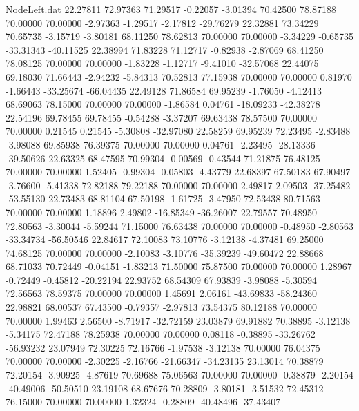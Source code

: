 \begin{filecontents}{NodeLeft.dat}
  22.27811   72.97363   71.29517    -0.22057   -3.01394   70.42500   78.87188   70.00000   70.00000   -2.97363   -1.29517   -2.17812  -29.76279
  22.32881   73.34229   70.65735    -3.15719   -3.80181   68.11250   78.62813   70.00000   70.00000   -3.34229   -0.65735  -33.31343  -40.11525
  22.38994   71.83228   71.12717    -0.82938   -2.87069   68.41250   78.08125   70.00000   70.00000   -1.83228   -1.12717   -9.41010  -32.57068
  22.44075   69.18030   71.66443    -2.94232   -5.84313   70.52813   77.15938   70.00000   70.00000    0.81970   -1.66443  -33.25674  -66.04435
  22.49128   71.86584   69.95239    -1.76050   -4.12413   68.69063   78.15000   70.00000   70.00000   -1.86584    0.04761  -18.09233  -42.38278
  22.54196   69.78455   69.78455    -0.54288   -3.37207   69.63438   78.57500   70.00000   70.00000    0.21545    0.21545   -5.30808  -32.97080
  22.58259   69.95239   72.23495    -2.83488   -3.98088   69.85938   76.39375   70.00000   70.00000    0.04761   -2.23495  -28.13336  -39.50626
  22.63325   68.47595   70.99304    -0.00569   -0.43544   71.21875   76.48125   70.00000   70.00000    1.52405   -0.99304   -0.05803   -4.43779
  22.68397   67.50183   67.90497    -3.76600   -5.41338   72.82188   79.22188   70.00000   70.00000    2.49817    2.09503  -37.25482  -53.55130
  22.73483   68.81104   67.50198    -1.61725   -3.47950   72.53438   80.71563   70.00000   70.00000    1.18896    2.49802  -16.85349  -36.26007
  22.79557   70.48950   72.80563    -3.30044   -5.59244   71.15000   76.63438   70.00000   70.00000   -0.48950   -2.80563  -33.34734  -56.50546
  22.84617   72.10083   73.10776    -3.12138   -4.37481   69.25000   74.68125   70.00000   70.00000   -2.10083   -3.10776  -35.39239  -49.60472
  22.88668   68.71033   70.72449    -0.04151   -1.83213   71.50000   75.87500   70.00000   70.00000    1.28967   -0.72449   -0.45812  -20.22194
  22.93752   68.54309   67.93839    -3.98088   -5.30594   72.56563   78.59375   70.00000   70.00000    1.45691    2.06161  -43.69833  -58.24360
  22.98821   68.00537   67.43500    -0.79357   -2.97813   73.54375   80.12188   70.00000   70.00000    1.99463    2.56500   -8.71917  -32.72159
  23.03879   69.91882   70.38895    -3.12138   -5.34175   72.47188   78.25938   70.00000   70.00000    0.08118   -0.38895  -33.26762  -56.93232
  23.07949   72.30225   72.16766    -1.97538   -3.12138   70.00000   76.04375   70.00000   70.00000   -2.30225   -2.16766  -21.66347  -34.23135
  23.13014   70.38879   72.20154    -3.90925   -4.87619   70.69688   75.06563   70.00000   70.00000   -0.38879   -2.20154  -40.49006  -50.50510
  23.19108   68.67676   70.28809    -3.80181   -3.51532   72.45312   76.15000   70.00000   70.00000    1.32324   -0.28809  -40.48496  -37.43407

\end{filecontents}
